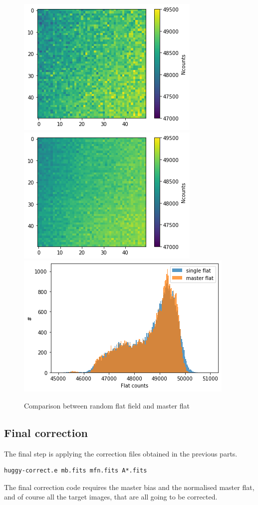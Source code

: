 \documentclass[a4paper,11pt,twocolumn]{article}
\begin{document}
\begin{figure}
    \centering  
    \includegraphics[scale=0.5, angle=0]{../pictures/pre-reduction/flat.png}
    \includegraphics[scale=0.5, angle=0]{../pictures/pre-reduction/master_flat.png}
    \includegraphics[scale=0.5, angle=0]{../pictures/pre-reduction/flat_comp.png}
    \caption{Comparison between random flat field and master flat}
\end{figure}

\subsection{Final correction}
The final step is applying the correction files obtained in the 
previous parts.
\begin{lstlisting}
huggy-correct.e mb.fits mfn.fits A*.fits
\end{lstlisting}
The final correction code requires the master bias and the normalised 
master flat, and of course all the target images, that are all going to be 
 corrected.
\end{document}
